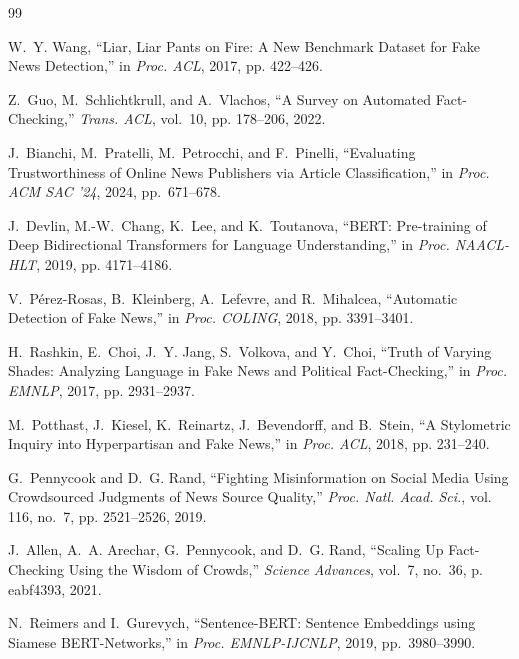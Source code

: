 \documentclass[twoside]{llncs}
\begin{document}
\begin{thebibliography}{99}
\fontsize{8pt}{9.5pt}\selectfont
\setlength{\itemsep}{0pt}
\setlength{\parsep}{0pt}
\setlength{\parskip}{0pt}

W.~Y. Wang, ``Liar, Liar Pants on Fire: A New Benchmark Dataset for Fake News Detection,'' in \emph{Proc. ACL}, 2017, pp. 422--426.

Z.~Guo, M.~Schlichtkrull, and A.~Vlachos, ``A Survey on Automated Fact-Checking,'' \emph{Trans. ACL}, vol.~10, pp. 178--206, 2022.

J.~Bianchi, M.~Pratelli, M.~Petrocchi, and F.~Pinelli, ``Evaluating Trustworthiness of Online News Publishers via Article Classification,'' in \emph{Proc. ACM SAC '24}, 2024, pp.~671--678.

J.~Devlin, M.-W.~Chang, K.~Lee, and K.~Toutanova, ``BERT: Pre-training of Deep Bidirectional Transformers for Language Understanding,'' in \emph{Proc. NAACL-HLT}, 2019, pp. 4171--4186.

V.~P{\'e}rez-Rosas, B.~Kleinberg, A.~Lefevre, and R.~Mihalcea, ``Automatic Detection of Fake News,'' in \emph{Proc. COLING}, 2018, pp. 3391--3401.

H.~Rashkin, E.~Choi, J.~Y. Jang, S.~Volkova, and Y.~Choi, ``Truth of Varying Shades: Analyzing Language in Fake News and Political Fact-Checking,'' in \emph{Proc. EMNLP}, 2017, pp. 2931--2937.

M.~Potthast, J.~Kiesel, K.~Reinartz, J.~Bevendorff, and B.~Stein, ``A Stylometric Inquiry into Hyperpartisan and Fake News,'' in \emph{Proc. ACL}, 2018, pp. 231--240.

G.~Pennycook and D.~G. Rand, ``Fighting Misinformation on Social Media Using Crowdsourced Judgments of News Source Quality,'' \emph{Proc. Natl. Acad. Sci.}, vol. 116, no.~7, pp. 2521--2526, 2019.

J.~Allen, A.~A. Arechar, G.~Pennycook, and D.~G. Rand, ``Scaling Up Fact-Checking Using the Wisdom of Crowds,'' \emph{Science Advances}, vol.~7, no.~36, p. eabf4393, 2021.

N.~Reimers and I.~Gurevych, ``Sentence-BERT: Sentence Embeddings using Siamese BERT-Networks,'' in \emph{Proc. EMNLP-IJCNLP}, 2019, pp.~3980--3990.


\end{thebibliography}
\end{document}
